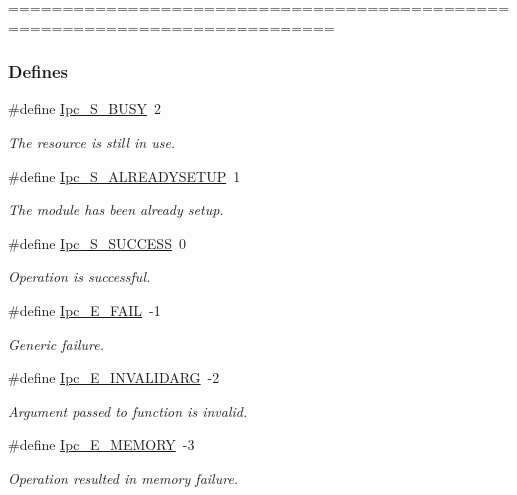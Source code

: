 ============================================================================ \subsubsection*{Defines}
\begin{DoxyCompactItemize}
\item 
\#define \hyperlink{_ipc_8h_a0d668ce8a2a1411b52db7dd0c930e0f0}{Ipc\_\-S\_\-BUSY}~2
\begin{DoxyCompactList}\small\item\em The resource is still in use. \item\end{DoxyCompactList}\item 
\#define \hyperlink{_ipc_8h_a1cffa46553c4e6cb6d699f9fdadadef8}{Ipc\_\-S\_\-ALREADYSETUP}~1
\begin{DoxyCompactList}\small\item\em The module has been already setup. \item\end{DoxyCompactList}\item 
\#define \hyperlink{_ipc_8h_a3f2ce5a89194a828588322cb29548360}{Ipc\_\-S\_\-SUCCESS}~0
\begin{DoxyCompactList}\small\item\em Operation is successful. \item\end{DoxyCompactList}\item 
\#define \hyperlink{_ipc_8h_a156e22baea9b53fb663a7bb8684022f1}{Ipc\_\-E\_\-FAIL}~-\/1
\begin{DoxyCompactList}\small\item\em Generic failure. \item\end{DoxyCompactList}\item 
\#define \hyperlink{_ipc_8h_aaf0d0edb6356669b49dcf0429e7705e0}{Ipc\_\-E\_\-INVALIDARG}~-\/2
\begin{DoxyCompactList}\small\item\em Argument passed to function is invalid. \item\end{DoxyCompactList}\item 
\#define \hyperlink{_ipc_8h_a55c40b7f048ac0aaf3b2836101c9dc81}{Ipc\_\-E\_\-MEMORY}~-\/3
\begin{DoxyCompactList}\small\item\em Operation resulted in memory failure. \item\end{DoxyCompactList}\item 

\end{DoxyCompactItemize}

